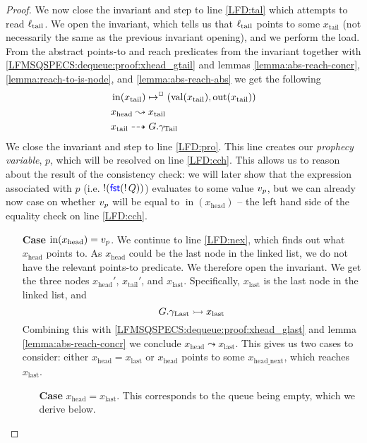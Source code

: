 \documentclass[a4paper, 10pt]{report}
\theoremstyle{definition}
\newcommand{\locN}[1]{\loc_{\mathrm{#1}}}
\newcommand{\loctail}{\locN{tail}}
\newcommand{\nIn}[1]{\operatorname{in}(#1)}
\newcommand{\nVal}[1]{\operatorname{val}(#1)}
\newcommand{\nOut}[1]{\operatorname{out}(#1)}
\newcommand{\node}{x}
\newcommand{\nodeN}[1]{\node_{\mathrm{#1}}}
\newcommand{\nodehead}{\nodeN{head}}
\newcommand{\nodetail}{\nodeN{tail}}
\newcommand{\nodelast}{\nodeN{last}}
\newcommand{\nodeheadnext}{\nodeN{head\_next}}
\newcommand{\prophval}{\val_p}
\newcommand{\Qg}{G}
\newcommand{\gtail}{\gname_{\mathrm{Tail}}}
\newcommand{\glast}{\gname_{\mathrm{Last}}}
\newcommand{\isNode}[1]{\nIn{#1} \mapsto^{\persistently} (\nVal{#1}, \nOut{#1})}
\newcommand{\reach}[2]{#1 \leadsto #2}
\newcommand{\ar}[2]{#1 \dashrightarrow #2}
\newcommand{\ap}[2]{#1 \rightarrowtail #2}
\begin{document}
\begin{proof}
  We now close the invariant and step to line \ref{LFD:tal} which attempts to read $\loctail$. We open the invariant, which tells us that $\loctail$ points to some $\nodetail$ (not necessarily the same as the previous invariant opening), and we perform the load. From the abstract points-to and reach predicates from the invariant together with \ref{LFMSQSPECS:dequeue:proof:xhead_gtail} and lemmas \ref{lemma:abs-reach-concr}, \ref{lemma:reach-to-is-node}, and \ref{lemma:abs-reach-abs} we get the following
  \begin{align}
    &\isNode{\nodetail}\label{LFMSQSPECS:dequeue:proof:xtail_node}\\
    &\reach{\nodehead}{\nodetail}\label{LFMSQSPECS:dequeue:proof:xhead_r_xtail}\\
    &\ar{\nodetail}{\Qg.\gtail}\label{LFMSQSPECS:dequeue:proof:xtail_gtail}\\
  \end{align}
  We close the invariant and step to line \ref{LFD:pro}. This line creates our \textit{prophecy variable}, $p$, which will be resolved on line \ref{LFD:cch}. This allows us to reason about the result of the consistency check: we will later show that the expression associated with $p$ (i.e. $\mathop{!}(\operatorname{\textsf{\color{blue} fst}} (\mathop{!} Q))$) evaluates to some value $\prophval$, but we can already now case on whether $\prophval$ will be equal to $\nIn{\nodehead}$ -- the left hand side of the equality check on line \ref{LFD:cch}.
  \begin{itemize}
    \item[\textbf{Case}] $\nIn{\nodehead} = \prophval$.
    We continue to line \ref{LFD:nex}, which finds out what $\nodehead$ points to. As $\nodehead$ could be the last node in the linked list, we do not have the relevant points-to predicate. We therefore open the invariant. We get the three nodes $\nodehead'$, $\nodetail'$, and $\nodelast$. Specifically, $\nodelast$ is the last node in the linked list, and
    \begin{equation}\label{LFMSQSPECS:dequeue:proof:glast_xlast}
      \ap{\Qg.\glast}{\nodelast}
    \end{equation}
    Combining this with \ref{LFMSQSPECS:dequeue:proof:xhead_glast} and lemma \ref{lemma:abs-reach-concr} we conclude $\reach{\nodehead}{\nodelast}$. This gives us two cases to consider: either $\nodehead = \nodelast$ or $\nodehead$ points to some $\nodeheadnext$, which reaches $\nodelast$.
    \begin{itemize}
      \item[\textbf{Case}] $\nodehead = \nodelast$. This corresponds to the queue being empty, which we derive below.\\

\end{itemize}
\end{itemize}
\end{proof}
\end{document}
